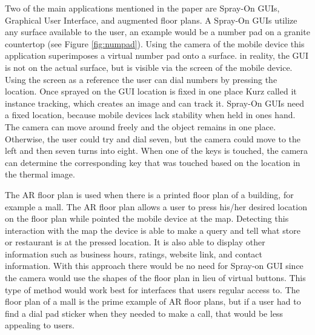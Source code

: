 \documentclass{sig-alternate}
\begin{document}
Two of the main applications mentioned in the paper are Spray-On GUIs, Graphical User Interface, and augmented floor plans. A Spray-On GUIs utilize any surface available to the user, an example would be a number pad on a granite countertop (see Figure \ref{fig:numpad}). Using the camera of the mobile device this application superimposes a virtual number pad onto a surface. in reality, the GUI is not on the actual surface, but is visible via the screen of the mobile device. Using the screen as a reference the user can dial numbers by pressing the location. Once sprayed on the GUI location is fixed in one place Kurz called it instance tracking, which creates an image and can track it. Spray-On GUIs need a fixed location, because mobile devices lack stability when held in ones hand. The camera can move around freely and the object remains in one place. Otherwise, the user could try and dial seven, but the camera could move to the left and then seven turns into eight. When one of the keys is touched, the camera can determine the corresponding key that was touched based on the location in the thermal image. 

The AR floor plan is used when there is a printed floor plan of a building, for example a mall. The AR floor plan allows a user to press his/her desired location on the floor plan while pointed the mobile device at the map. Detecting this interaction with the map the device is able to make a query and tell what store or restaurant is at the pressed location. It is also able to display other information such as business hours, ratings, website link, and contact information. With this approach there would be no need for Spray-on GUI since the camera would use the shapes of the floor plan in lieu of virtual buttons. This type of method would work best for interfaces that users regular access to. The floor plan of a mall is the prime example of AR floor plans, but if a user had to find a dial pad sticker when they needed to make a call, that would be less appealing to users.      
\end{document}
